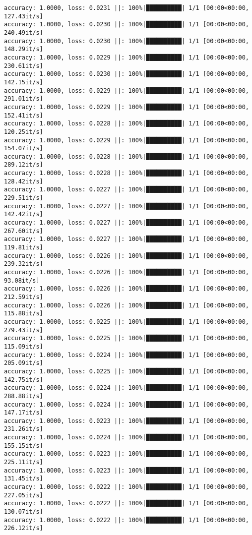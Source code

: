 \documentclass[
]{article}
\begin{document}
\begin{verbatim}
accuracy: 1.0000, loss: 0.0231 ||: 100%|██████████| 1/1 [00:00<00:00, 127.43it/s]
accuracy: 1.0000, loss: 0.0230 ||: 100%|██████████| 1/1 [00:00<00:00, 240.49it/s]
accuracy: 1.0000, loss: 0.0230 ||: 100%|██████████| 1/1 [00:00<00:00, 148.29it/s]
accuracy: 1.0000, loss: 0.0229 ||: 100%|██████████| 1/1 [00:00<00:00, 230.61it/s]
accuracy: 1.0000, loss: 0.0230 ||: 100%|██████████| 1/1 [00:00<00:00, 142.15it/s]
accuracy: 1.0000, loss: 0.0229 ||: 100%|██████████| 1/1 [00:00<00:00, 291.01it/s]
accuracy: 1.0000, loss: 0.0229 ||: 100%|██████████| 1/1 [00:00<00:00, 152.41it/s]
accuracy: 1.0000, loss: 0.0228 ||: 100%|██████████| 1/1 [00:00<00:00, 120.25it/s]
accuracy: 1.0000, loss: 0.0229 ||: 100%|██████████| 1/1 [00:00<00:00, 154.07it/s]
accuracy: 1.0000, loss: 0.0228 ||: 100%|██████████| 1/1 [00:00<00:00, 289.12it/s]
accuracy: 1.0000, loss: 0.0228 ||: 100%|██████████| 1/1 [00:00<00:00, 128.42it/s]
accuracy: 1.0000, loss: 0.0227 ||: 100%|██████████| 1/1 [00:00<00:00, 229.51it/s]
accuracy: 1.0000, loss: 0.0227 ||: 100%|██████████| 1/1 [00:00<00:00, 142.42it/s]
accuracy: 1.0000, loss: 0.0227 ||: 100%|██████████| 1/1 [00:00<00:00, 267.60it/s]
accuracy: 1.0000, loss: 0.0227 ||: 100%|██████████| 1/1 [00:00<00:00, 119.81it/s]
accuracy: 1.0000, loss: 0.0226 ||: 100%|██████████| 1/1 [00:00<00:00, 239.32it/s]
accuracy: 1.0000, loss: 0.0226 ||: 100%|██████████| 1/1 [00:00<00:00, 93.08it/s]
accuracy: 1.0000, loss: 0.0226 ||: 100%|██████████| 1/1 [00:00<00:00, 212.59it/s]
accuracy: 1.0000, loss: 0.0226 ||: 100%|██████████| 1/1 [00:00<00:00, 115.88it/s]
accuracy: 1.0000, loss: 0.0225 ||: 100%|██████████| 1/1 [00:00<00:00, 279.43it/s]
accuracy: 1.0000, loss: 0.0225 ||: 100%|██████████| 1/1 [00:00<00:00, 115.09it/s]
accuracy: 1.0000, loss: 0.0224 ||: 100%|██████████| 1/1 [00:00<00:00, 205.09it/s]
accuracy: 1.0000, loss: 0.0225 ||: 100%|██████████| 1/1 [00:00<00:00, 142.75it/s]
accuracy: 1.0000, loss: 0.0224 ||: 100%|██████████| 1/1 [00:00<00:00, 288.88it/s]
accuracy: 1.0000, loss: 0.0224 ||: 100%|██████████| 1/1 [00:00<00:00, 147.17it/s]
accuracy: 1.0000, loss: 0.0223 ||: 100%|██████████| 1/1 [00:00<00:00, 231.26it/s]
accuracy: 1.0000, loss: 0.0224 ||: 100%|██████████| 1/1 [00:00<00:00, 155.15it/s]
accuracy: 1.0000, loss: 0.0223 ||: 100%|██████████| 1/1 [00:00<00:00, 225.11it/s]
accuracy: 1.0000, loss: 0.0223 ||: 100%|██████████| 1/1 [00:00<00:00, 131.45it/s]
accuracy: 1.0000, loss: 0.0222 ||: 100%|██████████| 1/1 [00:00<00:00, 227.05it/s]
accuracy: 1.0000, loss: 0.0222 ||: 100%|██████████| 1/1 [00:00<00:00, 130.07it/s]
accuracy: 1.0000, loss: 0.0222 ||: 100%|██████████| 1/1 [00:00<00:00, 226.12it/s]

\end{verbatim}
\end{document}
